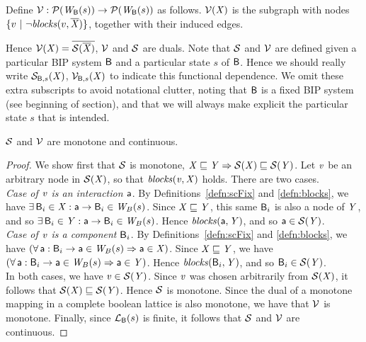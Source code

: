 \begin{definition}[$\VFs$]  \label{defn:violFix}
Define $\mathcal{V}: \mathcal{P}(\mathit{W}_{\mathsf{B}}({s})) \to \mathcal{P}(\mathit{W}_{\mathsf{B}}({s}))$ as follows.
$\mathcal{V}(\mathit{X})$ is the subgraph with nodes
$\{ v ~|~ \neg \mathit{blocks}(v, \overline{\mathit{\mathit{X}}}) \}$, together with their induced edges.
\end{definition}
%
Hence $\mathcal{V}(\mathit{X}) = \overline{\mathcal{S}(\overline{\mathit{X}})}$, \ie $\VFs$ and $\mathcal{S}$ are duals.
Note that $\mathcal{S}$ and $\VFs$ are defined given a particular BIP system 
$\mathsf{B}$ and a particular state $s$ of $\mathsf{B}$. Hence we should really write 
$\mathcal{S}_{\mathsf{B},s}(\mathit{X})$, $\mathcal{V}_{\mathsf{B},s}(\mathit{X})$ to indicate this functional dependence. We
omit these extra subscripts to avoid notational clutter, noting that
$\mathsf{B}$ is a fixed BIP system (see beginning of section), and that we will always make explicit
the particular state $s$ that is intended.



\begin{proposition} \label{prop:monotone}
$\mathcal{S}$ and $\VFs$ are monotone and continuous.
\end{proposition}
%
\begin{proof}
We show first that $\mathcal{S}$ is monotone, \ie $\mathit{X} \sqsubseteq \mathit{Y} \Rightarrow \mathcal{S}(\mathit{X}) \sqsubseteq \mathcal{S}(\mathit{Y})$.
Let $\mathit{v}$ be an arbitrary node in $\mathcal{S}(\mathit{X})$, so that $\mathit{blocks}(\mathit{v}, \mathit{X})$ holds. There are two cases.\\

\emph{Case of $\mathit{v}$ is an interaction $\mathsf{a}$}. By Definitions~\ref{defn:scFix} and \ref{defn:blocks}, we have $\exists\, \mathsf{B}_i \in \mathit{X}  : \mathsf{a} \rightarrow \mathsf{B}_i \in \mathit{W}_{B}({s})$.
Since $\mathit{X} \sqsubseteq \mathit{Y}$, this same $\mathsf{B}_i$ is also a node of $\mathit{Y}$, and so  $\exists\, \mathsf{B}_i \in \mathit{Y}  : \mathsf{a} \rightarrow \mathsf{B}_i \in \mathit{W}_{B}({s})$. 
Hence  $\mathit{blocks}(\mathsf{a}, \mathit{Y})$, and so $\mathsf{a} \in \mathcal{S}(\mathit{Y})$. \\

\emph{Case of $\mathit{v}$ is a component $\mathsf{B}_i$}. By Definitions~\ref{defn:scFix} and \ref{defn:blocks}, we have $(\forall\, \mathsf{a} : \mathsf{B}_i \rightarrow \mathsf{a} \in \mathit{W}_{B}({s}) \Rightarrow \mathsf{a} \in \mathit{X})$.
Since $\mathit{X} \sqsubseteq \mathit{Y}$, we have  $(\forall\, \mathsf{a} : \mathsf{B}_i \rightarrow \mathsf{a} \in \mathit{W}_{B}({s}) \Rightarrow \mathsf{a} \in \mathit{Y})$. 
Hence $\mathit{blocks}(\mathsf{B}_i, \mathit{Y})$, and so $\mathsf{B}_i \in \mathcal{S}(\mathit{Y})$. \\

In both cases, we have $\mathit{v} \in \mathcal{S}(\mathit{Y})$. Since $\mathit{v}$ was chosen arbitrarily from $\mathcal{S}(\mathit{X}) $, it follows that $\mathcal{S}(\mathit{X}) \sqsubseteq \mathcal{S}(\mathit{Y})$. Hence
$\mathcal{S}$ is monotone.
%
Since the dual of a monotone mapping in a complete boolean lattice is also monotone, we have that $\VFs$ is monotone.
%
Finally, since $\mathcal{L}_{\mathsf{B}}({s})$ is finite, it follows that $\mathcal{S}$ and $\VFs$ are continuous.
\end{proof}

